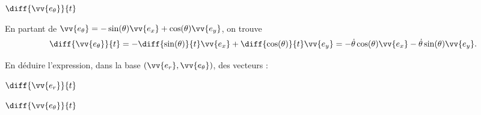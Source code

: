 \begin{enonce}
	$\diff{\vv{e_\theta}}{t}$
\end{enonce}


\begin{corrige}
 En partant de $\vv{e_\theta}=- \sin(\theta) \vv{e_x} + \cos (\theta) \vv{e_y}$, on trouve  
 \[
 \diff{\vv{e_\theta}}{t}=-\diff{\sin(\theta)}{t}\vv{e_x}+\diff{\cos(\theta)}{t}\vv{e_y}=-\dot{\theta}\cos(\theta) \vv{e_x} - \dot{\theta}\sin (\theta) \vv{e_y}.
 \]
\end{corrige}



\pauseEntrainement

En déduire l'expression, dans la base $(\vv{e_r}, \vv{e_\theta})$, des vecteurs : 

\repriseEntrainement




\begin{enonce}
	$\diff{\vv{e_r}}{t}$
\end{enonce}




\begin{enonce}
	$\diff{\vv{e_\theta}}{t}$
\end{enonce}




